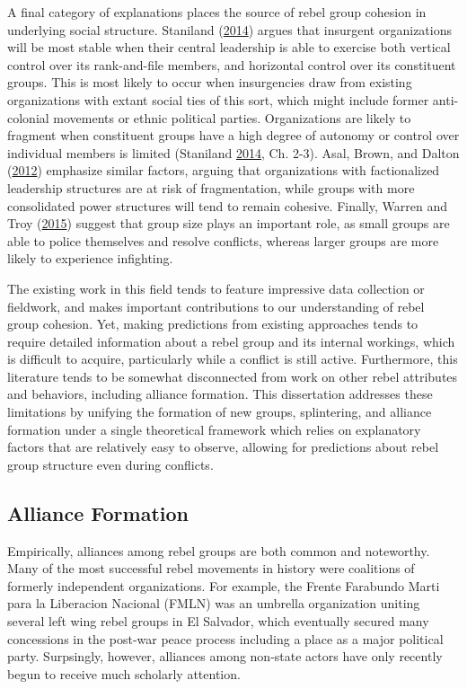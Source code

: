 \documentclass[12pt,]{book}
\theoremstyle{definition}
\theoremstyle{definition}
\theoremstyle{remark}
\begin{document}
A final category of explanations places the source of rebel group
cohesion in underlying social structure. Staniland
(\protect\hyperlink{ref-Staniland2014}{2014}) argues that insurgent
organizations will be most stable when their central leadership is able
to exercise both vertical control over its rank-and-file members, and
horizontal control over its constituent groups. This is most likely to
occur when insurgencies draw from existing organizations with extant
social ties of this sort, which might include former anti-colonial
movements or ethnic political parties. Organizations are likely to
fragment when constituent groups have a high degree of autonomy or
control over individual members is limited (Staniland
\protect\hyperlink{ref-Staniland2014}{2014}, Ch. 2-3). Asal, Brown, and
Dalton (\protect\hyperlink{ref-Asal2012}{2012}) emphasize similar
factors, arguing that organizations with factionalized leadership
structures are at risk of fragmentation, while groups with more
consolidated power structures will tend to remain cohesive. Finally,
Warren and Troy (\protect\hyperlink{ref-Warren2015}{2015}) suggest that
group size plays an important role, as small groups are able to police
themselves and resolve conflicts, whereas larger groups are more likely
to experience infighting.

The existing work in this field tends to feature impressive data
collection or fieldwork, and makes important contributions to our
understanding of rebel group cohesion. Yet, making predictions from
existing approaches tends to require detailed information about a rebel
group and its internal workings, which is difficult to acquire,
particularly while a conflict is still active. Furthermore, this
literature tends to be somewhat disconnected from work on other rebel
attributes and behaviors, including alliance formation. This
dissertation addresses these limitations by unifying the formation of
new groups, splintering, and alliance formation under a single
theoretical framework which relies on explanatory factors that are
relatively easy to observe, allowing for predictions about rebel group
structure even during conflicts.

\subsection{Alliance Formation}\label{alliance-formation}

Empirically, alliances among rebel groups are both common and
noteworthy. Many of the most successful rebel movements in history were
coalitions of formerly independent organizations. For example, the
Frente Farabundo Marti para la Liberacion Nacional (FMLN) was an
umbrella organization uniting several left wing rebel groups in El
Salvador, which eventually secured many concessions in the post-war
peace process including a place as a major political party. Surpsingly,
however, alliances among non-state actors have only recently begun to
receive much scholarly attention.
\end{document}
